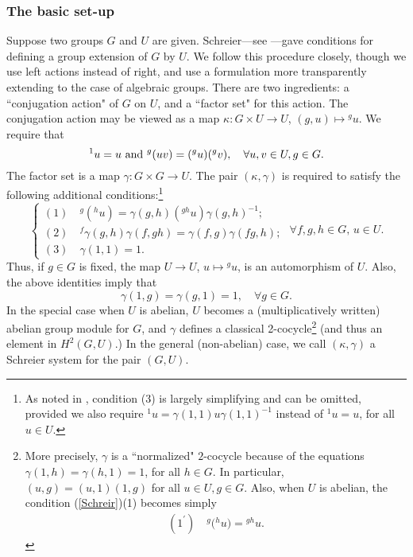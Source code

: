 \documentclass[11pt,leqno,amscd,amssymb,verbatim, url]{amsart}
\theoremstyle{definition}
\numberwithin{equation}{thm}
\begin{document}
\subsubsection{The basic set-up} Suppose two groups $G$ and $U$ are given. Schreier---see
\cite[\S15.1]{Hall}---gave conditions for defining a group extension of $G$ by $U$. We follow this procedure closely, though
we use left actions instead of right, and use a formulation more transparently extending to the case of algebraic groups.
There are two ingredients: a ``conjugation action" of $G$ on $U$, and a ``factor set" for this action. The conjugation action
may be viewed as a map $\kappa:G\times U\to U$, $(g,u)\mapsto {^gu}$. We require that 
$$^1u=u\,\,{\text{\rm and}}\,\, {^g(uv)}=({^gu})({^gv}),\quad\forall
u,v\in U, g\in G.$$
 The factor set is a map $\gamma:G\times G\to U$. The pair $(\kappa,\gamma)$
is required to satisfy the following additional conditions:\footnote{As noted in \cite{Hall}, condition (3) is largely simplifying and
can be omitted, provided we also require $^1u=\gamma(1,1)u\gamma(1,1)^{-1}$ instead of $^1u=u$, for all $u\in U$.}
\begin{equation}\label{Schreir}\begin{cases}(1) \quad^g({^hu})=\gamma(g,h)({^{gh}u})\gamma(g,h)^{-1};\\
(2)\quad ^f\gamma(g,h)\gamma(f,gh)=\gamma(f,g)\gamma(fg,h);\\
(3) \quad \gamma(1,1)=1.\end{cases}\,\,\forall f,g,h\in G, \,u\in U.\end{equation}
Thus, if $g\in G$ is fixed,
the map $U\to U$, $u\mapsto {^gu}$, is an automorphism of $U$. Also, the above identities imply that
\begin{equation}\label{cocyclevanishing}\gamma(1,g)=\gamma(g,1)=1,\quad\forall g\in G.\end{equation}
In the special case when $U$ is abelian, $U$ becomes a
(multiplicatively written) abelian group module for $G$, and $\gamma$ defines a classical 2-cocycle\footnote{More precisely,
 $\gamma$ is a ``normalized" $2$-cocycle because of the equations $\gamma(1,h)=\gamma(h,1)=1$, for all $h\in G$. In particular, $(u,g)=(u,1)(1,g)$ for all $u\in U, g\in G$. Also, when $U$ is abelian, the condition (\ref{Schreir})(1) becomes 
 simply
$$ \begin{aligned} (1^\prime)\quad {^g(}{^hu})={^{gh}u}.\end{aligned}
 $$} (and thus
an element in $H^2(G,U)$.) In the general (non-abelian) case, we call $(\kappa,\gamma)$ a Schreier system for the pair $(G,U)$.
\end{document}
